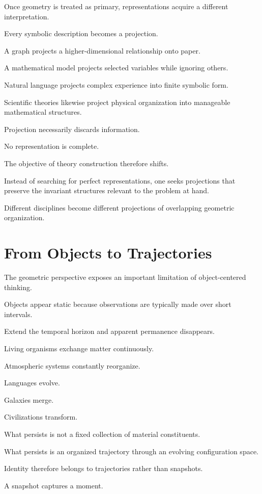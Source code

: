 \documentclass[11pt,oneside]{book}
\numberwithin{equation}{chapter}
\theoremstyle{definition}
\theoremstyle{plain}
\begin{document}
Once geometry is treated as primary, representations acquire a different
interpretation.

Every symbolic description becomes a projection.

A graph projects a higher-dimensional relationship onto paper.

A mathematical model projects selected variables while ignoring others.

Natural language projects complex experience into finite symbolic form.

Scientific theories likewise project physical organization into manageable
mathematical structures.

Projection necessarily discards information.

No representation is complete.

The objective of theory construction therefore shifts.

Instead of searching for perfect representations, one seeks projections that
preserve the invariant structures relevant to the problem at hand.

Different disciplines become different projections of overlapping geometric
organization.

\section{From Objects to Trajectories}

The geometric perspective exposes an important limitation of object-centered
thinking.

Objects appear static because observations are typically made over short
intervals.

Extend the temporal horizon and apparent permanence disappears.

Living organisms exchange matter continuously.

Atmospheric systems constantly reorganize.

Languages evolve.

Galaxies merge.

Civilizations transform.

What persists is not a fixed collection of material constituents.

What persists is an organized trajectory through an evolving configuration
space.

Identity therefore belongs to trajectories rather than snapshots.

A snapshot captures a moment.
\end{document}
